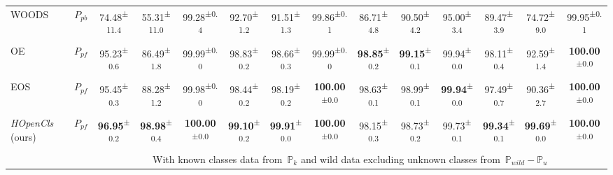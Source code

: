 \begin{table*}[!t]
{\begin{tabular}{lccccccccccccc}
    WOODS~\cite{WOODS}                                        & $P_{pb}$                     & 74.48\textsuperscript{±11.4}         & 55.31\textsuperscript{±11.0}         & 99.28\textsuperscript{±0.4}           & 92.70\textsuperscript{±1.2}          & 91.51\textsuperscript{±1.3}          & 99.86\textsuperscript{±0.1}           & 86.71\textsuperscript{±4.8}          & 90.50\textsuperscript{±4.2}          & 95.00\textsuperscript{±3.4}          & 89.47\textsuperscript{±3.9}          & 74.72\textsuperscript{±9.0}          & 99.95\textsuperscript{±0.1}            \\
    OE~\cite{OE}                                           & $P_{pf}$                     & 95.23\textsuperscript{±0.6}          & 86.49\textsuperscript{±1.8}          & 99.99\textsuperscript{±0.0}           & 98.83\textsuperscript{±0.2}          & 98.66\textsuperscript{±0.3}          & 99.99\textsuperscript{±0.0}           & \textbf{98.85}\textsuperscript{±0.2} & \textbf{99.15}\textsuperscript{±0.1} & 99.94\textsuperscript{±0.0}          & 98.11\textsuperscript{±0.4}          & 92.59\textsuperscript{±1.4}          & \textbf{100.00}\textsuperscript{±0.0}  \\
    EOS~\cite{EOS}                                          & $P_{pf}$                     & 95.45\textsuperscript{±0.3}          & 88.28\textsuperscript{±1.2}          & 99.98\textsuperscript{±0.0}           & 98.44\textsuperscript{±0.2}          & 98.19\textsuperscript{±0.2}          & \textbf{100.00}\textsuperscript{±0.0} & 98.63\textsuperscript{±0.1}          & 98.99\textsuperscript{±0.1}          & \textbf{99.94}\textsuperscript{±0.0} & 97.49\textsuperscript{±0.7}          & 90.36\textsuperscript{±2.7}          & \textbf{100.00}\textsuperscript{±0.0}  \\
    \textit{HOpenCls} (ours)                                     & $P_{pf}$                     & \textbf{96.95}\textsuperscript{±0.2} & \textbf{98.98}\textsuperscript{±0.4} & \textbf{100.00}\textsuperscript{±0.0} & \textbf{99.10}\textsuperscript{±0.2} & \textbf{99.91}\textsuperscript{±0.0} & \textbf{100.00}\textsuperscript{±0.0} & 98.15\textsuperscript{±0.3}          & 98.73\textsuperscript{±0.2}          & 99.73\textsuperscript{±0.1}          & \textbf{99.34}\textsuperscript{±0.1} & \textbf{99.69}\textsuperscript{±0.0} & \textbf{100.00}\textsuperscript{±0.0}  \\ 
    \hline
                                                 &                              & \multicolumn{12}{c}{{\cellcolor[rgb]{0.753,0.753,0.753}}With known classes data from~$\mathbb{P}_{k}$ and wild data excluding unknown classes from~$\mathbb{P}_{wild}-\mathbb{P}_{u}$}                                                                                                                                                                                                                                                                                                                                                                 \\

\end{tabular}}
\end{table*}
